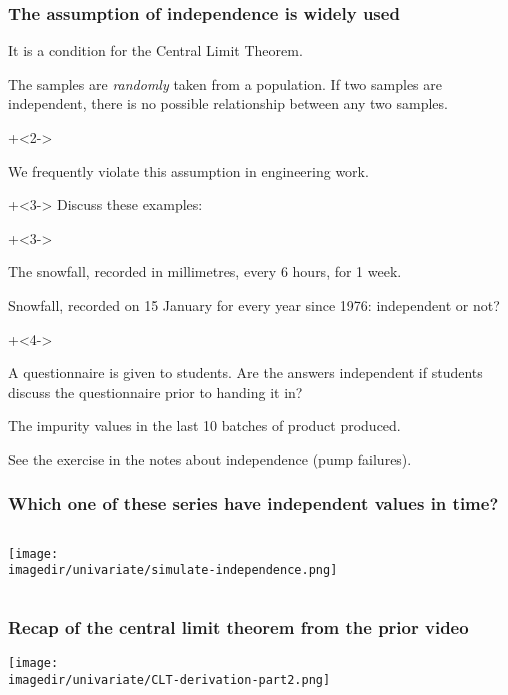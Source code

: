 \begin{frame}\frametitle{The assumption of \textbf{independence} is widely used}

	It is a condition for the Central Limit Theorem.
	\begin{block}
		{\color{purple}{Independence}}
		\begin{center}
			The samples are \emph{randomly} taken from a population. If two samples are independent, there is no possible relationship between any two samples.
		\end{center}
	\end{block}
	\onslide+<2->{

		\vspace{12pt}
		{\color{myOrange}We frequently violate this assumption in engineering work. }
	}
	
	\onslide+<3->{
		\vspace{6pt}
		Discuss these examples:
	}
	\begin{itemize}
		\onslide+<3->{
			\item	The snowfall, recorded in millimetres, every 6 hours, for 1 week.
			\item	Snowfall, recorded on 15 January for every year since 1976: independent or not?
		}
		\onslide+<4->{
			\item	A questionnaire is given to students. Are the answers independent if students discuss the questionnaire prior to handing it in?
			\item	The impurity values in the last 10 batches of product produced.
			\item	See the exercise in the notes about independence (pump failures).
		}
	\end{itemize}
\end{frame}

\begin{frame}\frametitle{Which one of these series have independent values in time?}
	\begin{columns}[t]
			\texttt{[image: \\imagedir/univariate/simulate-independence.png]}
	\end{columns}
	
\end{frame}


\begin{frame}\frametitle{Recap of the central limit theorem from the prior video}
	\texttt{[image: \\imagedir/univariate/CLT-derivation-part2.png]}
\end{frame}

